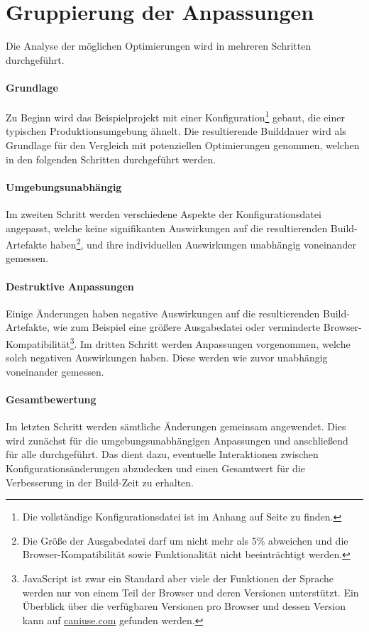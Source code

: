 \documentclass[11pt]{report}
\begin{document}
		\section{Gruppierung der Anpassungen}
			Die Analyse der möglichen Optimierungen wird in mehreren Schritten durchgeführt.
			\paragraph{Grundlage}\label{baseline-build} Zu Beginn wird das Beispielprojekt mit einer Konfiguration\footnote{Die vollständige Konfigurationsdatei ist im Anhang auf Seite \pageref{baseline-build} zu finden.} gebaut, die einer typischen Produktionsumgebung ähnelt. Die resultierende Builddauer wird als Grundlage für den Vergleich mit potenziellen Optimierungen genommen, welchen in den folgenden Schritten durchgeführt werden.

			\paragraph{Umgebungsunabhängig} Im zweiten Schritt werden verschiedene Aspekte der Konfigurationsdatei angepasst, welche keine signifikanten Auswirkungen auf die resultierenden Build-Artefakte haben\footnote{Die Größe der Ausgabedatei darf um nicht mehr als $5 \%$ abweichen und die Browser-Kompatibilität sowie Funktionalität nicht beeinträchtigt werden.}, und ihre individuellen Auswirkungen unabhängig voneinander gemessen.

			\paragraph{Destruktive Anpassungen} Einige Änderungen haben negative Auswirkungen auf die resultierenden Build-Artefakte, wie zum Beispiel eine größere Ausgabedatei oder verminderte Browser-Kompatibilität\footnote{JavaScript ist zwar ein Standard aber viele der Funktionen der Sprache werden nur von einem Teil der Browser und deren Versionen unterstützt. Ein Überblick über die verfügbaren Versionen pro Browser und dessen Version kann auf \href{https://caniuse.com/}{caniuse.com} gefunden werden.}. Im dritten Schritt werden Anpassungen vorgenommen, welche solch negativen Auswirkungen haben. Diese werden wie zuvor unabhängig voneinander gemessen.

			\paragraph{Gesamtbewertung} Im letzten Schritt werden sämtliche Änderungen gemeinsam angewendet. Dies wird zunächst für die umgebungsunabhängigen Anpassungen und anschließend für alle durchgeführt. Das dient dazu, eventuelle Interaktionen zwischen Konfigurationsänderungen abzudecken und einen Gesamtwert für die Verbesserung in der Build-Zeit zu erhalten.
	\clearpage
\end{document}
